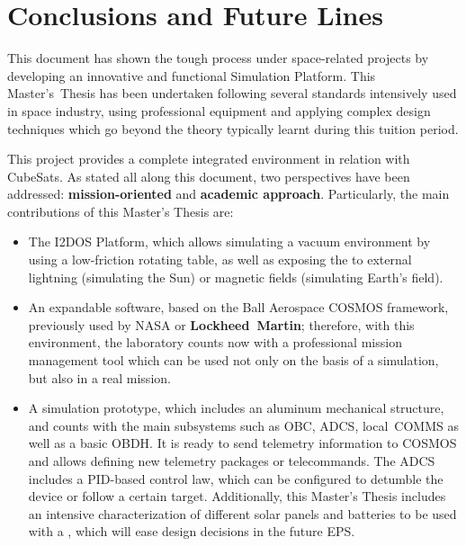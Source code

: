 \chapter{Conclusions and Future Lines}\label{chap:chapter6}

This document has shown the tough process under space-related projects by developing an innovative and functional  Simulation Platform. This Master's~Thesis has been undertaken following several standards intensively used in space industry, using professional equipment and applying complex design techniques which go beyond the theory typically learnt during this tuition period.

This project provides a complete integrated environment in relation with CubeSats. As stated all along this document, two perspectives have been addressed: \textbf{mission-oriented} and \textbf{academic approach}. Particularly, the main contributions of this Master's Thesis are:

\begin{itemize} [topsep=0pt]

\item The \acrshort{I2DOS} Platform, which allows simulating a vacuum environment by using a low-friction rotating table, as well as exposing the  to external lightning (simulating the Sun) or magnetic fields (simulating Earth's field). 

\item An expandable  software, based on the Ball Aerospace COSMOS framework, previously used by \acrshort{NASA} or \textbf{Lockheed~Martin}; therefore, with this environment, the  laboratory counts now with a professional mission management tool which can be used not only on the basis of a simulation, but also in a real mission.

\item A simulation  prototype, which includes an aluminum mechanical structure, and counts with the main subsystems such as \acrshort{OBC}, \acrshort{ADCS}, local~COMMS as well as a basic \acrshort{OBDH}. It is ready to send telemetry information to COSMOS and allows defining new telemetry packages or telecommands. The \acrshort{ADCS} includes a \acrshort{PID}-based control law, which can be configured to detumble the device or follow a certain target. Additionally, this Master's Thesis includes an intensive characterization of different solar panels and batteries to be used with a , which will ease design decisions in the future \acrshort{EPS}.

\end{itemize}

